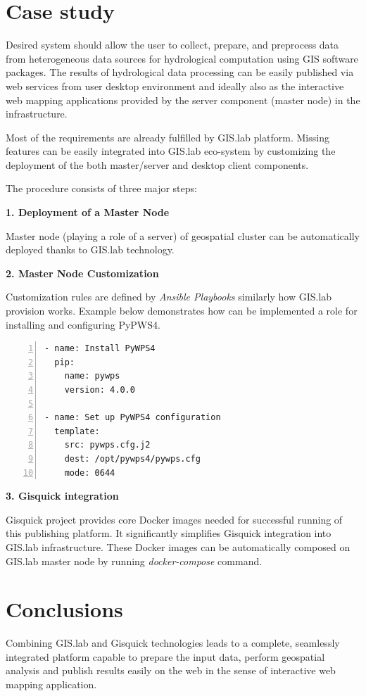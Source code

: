 \documentclass{tudelftposter}
\begin{document}
\section{Case study}

Desired system should allow the user to collect, prepare, and
preprocess data from heterogeneous data sources for hydrological
computation using GIS software packages. The results of hydrological
data processing can be easily published via web services from user
desktop environment and ideally also as the interactive web mapping
applications provided by the server component (master node) in the
infrastructure.

Most of the requirements are already fulfilled by GIS.lab
platform. Missing features can be easily integrated into GIS.lab
eco-system by customizing the deployment of the both master/server and
desktop client components.

\vskip 0.4in

\noindent The procedure consists of three major steps:

\vskip 0.1in

\textbf{1. Deployment of  a Master Node}

Master node (playing a role of a server) of geospatial cluster can be
automatically deployed thanks to GIS.lab technology.

\textbf{2. Master Node Customization}

Customization rules are defined by \textit{Ansible Playbooks}
similarly how GIS.lab provision works. Example below demonstrates how
can be implemented a role for installing and configuring PyPWS4.

\begin{lstlisting}[numbers=left,xleftmargin=1em]
- name: Install PyWPS4
  pip:
    name: pywps
    version: 4.0.0

- name: Set up PyWPS4 configuration
  template:
    src: pywps.cfg.j2
    dest: /opt/pywps4/pywps.cfg
    mode: 0644
\end{lstlisting}

\textbf{3. Gisquick integration}

Gisquick project provides core Docker images needed for successful
running of this publishing platform. It significantly simplifies
Gisquick integration into GIS.lab infrastructure. These Docker images
can be automatically composed on GIS.lab master node by running
\textit{docker-compose} command.

\section{Conclusions}

Combining GIS.lab and Gisquick technologies leads to a complete, seamlessly
integrated platform capable to prepare the input data, perform geospatial
analysis and publish results easily on the web in the sense of interactive
web mapping application.
\end{document}
